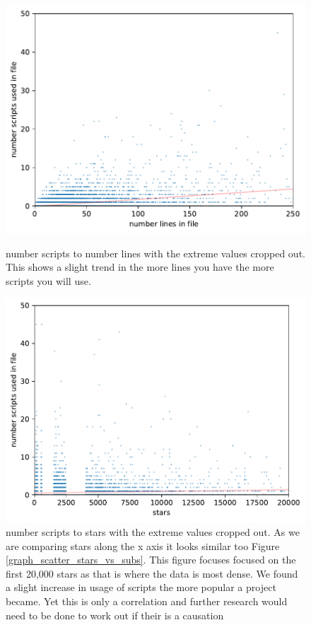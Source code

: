 \documentclass[10pt,conference]{IEEEtran}
\begin{document}
\begin{figure}[!ht]
  \centering
  \begin{minipage}[!t]{.48\textwidth}
    \includegraphics[width=\textwidth]{../src/results/scripts vs lines.pdf}
    \caption{number scripts to number lines with the extreme values cropped out. This shows a slight trend in the more lines you have the more scripts you will use.}
    \label{fig:script_scatter_lines}    
  \end{minipage}%
  \hfill
  \begin{minipage}[!t]{.48\textwidth}
    \includegraphics[width=\textwidth]{../src/results/scripts vs stars.pdf}
    \caption{number scripts to stars with the extreme values cropped out. As we are comparing stars along the x axis it looks similar too Figure \ref{graph_scatter_stars_vs_subs}. This figure focuses focused on the first 20,000 stars as that is where the data is most dense. We found a slight increase in usage of scripts the more popular a project became. Yet this is only a correlation and further research would need to be done to work out if their is a causation}
    \label{fig:script_scatter_lines2}
  \end{minipage}
\end{figure}
\end{document}
